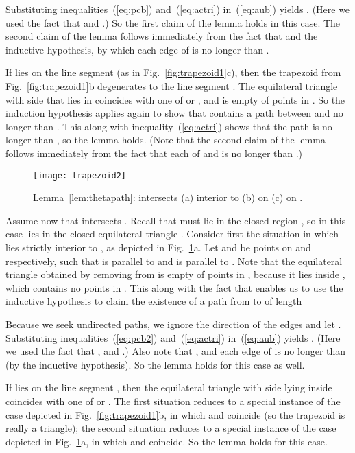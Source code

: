 \documentclass[11pt]{article}
\begin{document}
Substituting inequalities~(\ref{eq:pcb}) and~(\ref{eq:actri}) in~(\ref{eq:aub}) yields . (Here we used the fact that  and .) So the first claim of the lemma holds in this case. The second claim of the lemma follows immediately from the fact that  and the inductive hypothesis, by which each edge of  is no longer than .

If  lies on the line segment  (as in Fig.~\ref{fig:trapezoid1}c), then the trapezoid  from Fig.~\ref{fig:trapezoid1}b degenerates to the line segment . The equilateral triangle with side  that lies in  coincides with one of  or , and is empty of points in . So the induction hypothesis applies again to show that  contains a path between  and  no longer than . This along with inequality~(\ref{eq:actri}) shows that the path  is no longer than , so the lemma holds. (Note that the second claim of the lemma follows immediately from the fact that each of  and  is no longer than .)

\begin{figure}[htpb]
\centering
\texttt{[image: trapezoid2]}
\caption{Lemma~\ref{lem:thetapath}:  intersects  (a)  interior to  (b)  on  (c)  on .}
\label{fig:trapezoid2}
\end{figure}


Assume now that  intersects . Recall that  must lie in the closed region , so in this case  lies in the closed equilateral triangle .
Consider first the situation in which  lies strictly interior to , as depicted in  Fig.~\ref{fig:trapezoid2}a. Let  and  be points on  and  respectively, such that  is parallel to  and  is parallel to . Note that the equilateral triangle obtained by removing  from  is empty of points in , because it lies inside , which contains no points in .
This along with the fact that  enables us to use the inductive hypothesis to claim the existence of a path  from  to  of length

Because we seek undirected paths, we ignore the direction of the edges and let . Substituting inequalities~(\ref{eq:pcb2}) and~(\ref{eq:actri}) in~(\ref{eq:aub}) yields
. (Here we used the fact that , and .) Also note that , and each edge of  is no longer than  (by the inductive hypothesis). So the lemma holds for this case as well.

If  lies on the line segment , then the equilateral triangle with side  lying inside  coincides with one of  or . The first situation reduces to a special instance of the case depicted in Fig.~\ref{fig:trapezoid1}b, in which  and  coincide (so the trapezoid  is really a triangle); the second situation reduces to a special instance of the case depicted in Fig.~\ref{fig:trapezoid2}a, in which  and  coincide. So the lemma holds for this case.
\end{document}

